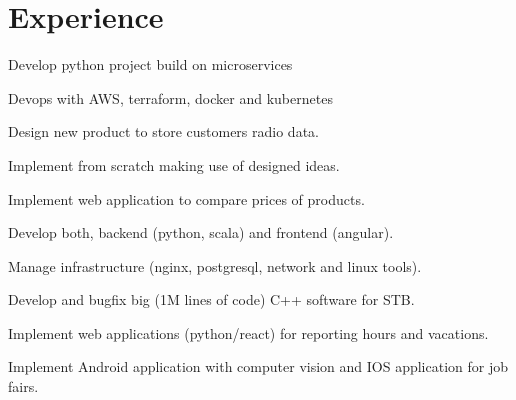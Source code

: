 \documentclass[]{deedy-resume-openfont}
\begin{document}
\hfill
\begin{minipage}[t]{0.66\textwidth} 




\section{Experience}

\vspace{\topsep} %
\begin{tightemize}
\item Develop python project build on microservices 
\item Devops with AWS, terraform, docker and kubernetes
\end{tightemize}
\sectionsep
{}
\vspace{\topsep} %
\begin{tightemize}
\item Design new product to store customers radio data.
\item Implement from scratch making use of designed ideas.
\end{tightemize}
\sectionsep

\begin{tightemize}
\item Implement web application to compare prices of products.
\item Develop both, backend (python, scala) and frontend (angular).
\item Manage infrastructure (nginx, postgresql, network and linux tools).
\end{tightemize}
\sectionsep

\begin{tightemize}
\item Develop and bugfix big (1M lines of code) C++ software for STB.
\item Implement web applications (python/react) for reporting hours and vacations.
\item Implement Android application with computer vision and IOS application for job fairs.
\end{tightemize}
\sectionsep


\end{minipage}
\end{document}
